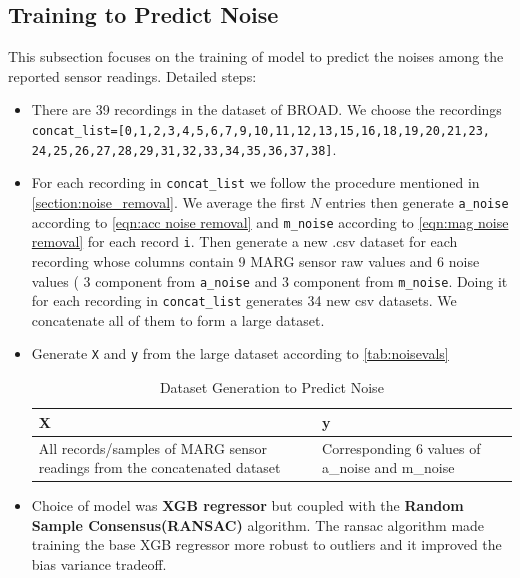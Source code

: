 \documentclass{iutbscthesis}
\begin{document}
\subsection{Training to Predict Noise} \label{subsec:predictnoise}
This subsection focuses on the training of model to predict the noises among the reported sensor readings. Detailed steps:
\begin{itemize}
    \item There are 39 recordings in the dataset of BROAD. We choose the recordings \texttt{concat\_list=[0,1,2,3,4,5,6,7,9,10,11,12,13,15,16,18,19,20,21,23, \\ 24,25,26,27,28,29,31,32,33,34,35,36,37,38]}.
    
    \item For each recording in \texttt{concat\_list} we follow the procedure mentioned in \autoref{section:noise_removal}. We average the first $N$ entries then generate \texttt{a\_noise} according to \autoref{eqn:acc noise removal} and \texttt{m\_noise} according to \autoref{eqn:mag noise removal} for each record \texttt{i}. Then generate a new .csv dataset for each recording whose columns contain 9 MARG sensor raw values and 6 noise values ( 3 component from \texttt{a\_noise} and 3 component from \texttt{m\_noise}. Doing it for each recording in \texttt{concat\_list} generates 34 new csv datasets. We concatenate all of them to form a large dataset.
    \item Generate \texttt{X} and \texttt{y} from the large dataset according to \autoref{tab:noisevals}
        \begin{table}[H]
        \centering
        \caption{Dataset Generation to Predict Noise}    \label{tab:noisevals}
            \begin{adjustbox}{max width=0.8\textwidth}
                \begin{tabular}{| p{} | p{} |}
                \hline
                \textbf{X} & \textbf{y} \\
                \hline
                All records/samples of MARG sensor readings from the concatenated dataset & Corresponding 6 values of a\_noise and m\_noise \\
                \hline
                \end{tabular}
            \end{adjustbox}
        \end{table}
    
    \item Choice of model was \textbf{XGB regressor} but coupled with the \textbf{Random Sample Consensus(RANSAC)}\cite{fischler1981random} algorithm. The ransac algorithm made training the base XGB regressor more robust to outliers and it improved the bias variance tradeoff.
    

\end{itemize}
\end{document}
